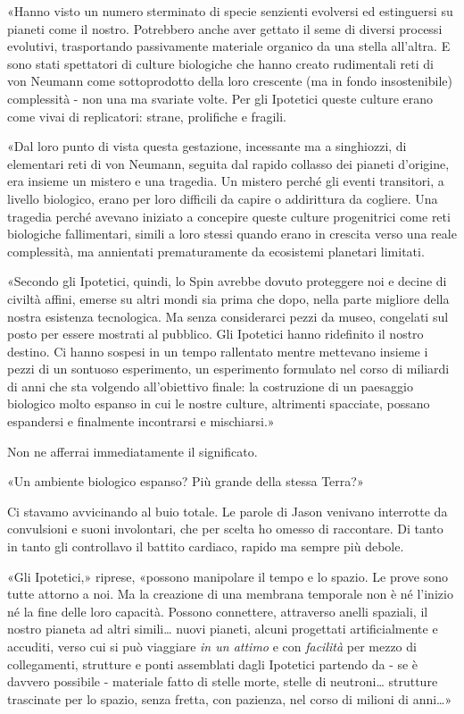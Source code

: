 «Hanno visto un numero sterminato di specie senzienti evolversi ed
estinguersi su pianeti come il nostro. Potrebbero anche aver gettato il
seme di diversi processi evolutivi, trasportando passivamente materiale
organico da una stella all'altra. E sono stati spettatori di culture
biologiche che hanno creato rudimentali reti di von Neumann come
sottoprodotto della loro crescente (ma in fondo insostenibile)
complessità - non una ma svariate volte. Per gli Ipotetici queste
culture erano come vivai di replicatori: strane, prolifiche e fragili.

«Dal loro punto di vista questa gestazione, incessante ma a singhiozzi,
di elementari reti di von Neumann, seguita dal rapido collasso dei
pianeti d'origine, era insieme un mistero e una tragedia. Un mistero
perché gli eventi transitori, a livello biologico, erano per loro
difficili da capire o addirittura da cogliere. Una tragedia perché
avevano iniziato a concepire queste culture progenitrici come reti
biologiche fallimentari, simili a loro stessi quando erano in crescita
verso una reale complessità, ma annientati prematuramente da ecosistemi
planetari limitati.

«Secondo gli Ipotetici, quindi, lo Spin avrebbe dovuto proteggere noi e
decine di civiltà affini, emerse su altri mondi sia prima che dopo,
nella parte migliore della nostra esistenza tecnologica. Ma senza
considerarci pezzi da museo, congelati sul posto per essere mostrati al
pubblico. Gli Ipotetici hanno ridefinito il nostro destino. Ci hanno
sospesi in un tempo rallentato mentre mettevano insieme i pezzi di un
sontuoso esperimento, un esperimento formulato nel corso di miliardi di
anni che sta volgendo all'obiettivo finale: la costruzione di un
paesaggio biologico molto espanso in cui le nostre culture, altrimenti
spacciate, possano espandersi e finalmente incontrarsi e mischiarsi.»

\separatorefiori

Non ne afferrai immediatamente il significato.

«Un ambiente biologico espanso? Più grande della stessa Terra?»

Ci stavamo avvicinando al buio totale. Le parole di Jason venivano
interrotte da convulsioni e suoni involontari, che per scelta ho omesso
di raccontare. Di tanto in tanto gli controllavo il battito cardiaco,
rapido ma sempre più debole.

«Gli Ipotetici,» riprese, «possono manipolare il tempo e lo spazio. Le
prove sono tutte attorno a noi. Ma la creazione di una membrana
temporale non è né l'inizio né la fine delle loro capacità. Possono
connettere, attraverso anelli spaziali, il nostro pianeta ad altri
simili\ldots{} nuovi pianeti, alcuni progettati artificialmente e
accuditi, verso cui si può viaggiare \emph{in un attimo} e con
\emph{facilità} per mezzo di collegamenti, strutture e ponti assemblati
dagli Ipotetici partendo da - se è davvero possibile - materiale fatto
di stelle morte, stelle di neutroni\ldots{} strutture trascinate per lo
spazio, senza fretta, con pazienza, nel corso di milioni di anni\ldots»

